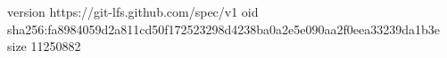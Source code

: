 version https://git-lfs.github.com/spec/v1
oid sha256:fa8984059d2a811cd50f172523298d4238ba0a2e5e090aa2f0eea33239da1b3e
size 11250882
